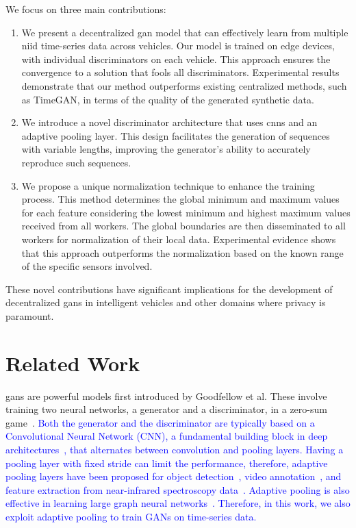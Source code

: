 We focus on three main contributions:
%
\begin{enumerate}
    \item We present a decentralized \gls*{gan} model that can effectively learn from multiple \gls*{niid} time-series data across vehicles. Our model is trained on edge devices, with individual discriminators on each vehicle. This approach ensures the convergence to a solution that fools all discriminators. Experimental results demonstrate that our method outperforms existing centralized methods, such as TimeGAN, in terms of the quality of the generated synthetic data.
%
    \item We introduce a novel discriminator architecture that uses \glspl*{cnn} and an adaptive pooling layer. This design facilitates the generation of sequences with variable lengths, improving the generator's ability to accurately reproduce such sequences.
%
    \item We propose a unique normalization technique to enhance the training process. This method determines the global minimum and maximum values for each feature considering the lowest minimum and highest maximum values received from all workers. The global boundaries are then disseminated to all workers for normalization of their local data. Experimental evidence shows that this approach outperforms the normalization based on the known range of the specific sensors involved.
\end{enumerate}

These novel contributions have significant implications for the development of decentralized \glspl*{gan} in intelligent vehicles and other domains where privacy is paramount.
%
\section{Related Work}

\glspl*{gan} are powerful models first introduced by Goodfellow et al. These involve training two neural networks, a generator and a discriminator, in a zero-sum game~\cite{goodfellow_generative_2014}. \textcolor{blue}{
 Both the generator and the discriminator are typically based on a Convolutional Neural Network (CNN), a fundamental building block in deep architectures~\cite{lecun2015deep}, that alternates between convolution and pooling layers. Having a pooling layer with fixed stride can limit the performance, therefore, adaptive pooling layers have been proposed for object detection~\cite{tsai2015adaptive}, video annotation~\cite{Liu2017Adaptive}, and feature extraction from near-infrared spectroscopy data~\cite{CHEN2020106303}. Adaptive pooling is also effective in learning large graph neural networks~\cite{ranjan2020asap}. Therefore, in this work, we also exploit adaptive pooling to train GANs on time-series data.
}

